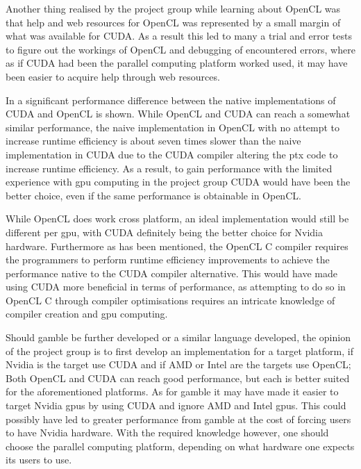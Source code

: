 Another thing realised by the project group while learning about OpenCL was that help and web resources for OpenCL was represented by a small margin of what was available for CUDA.
As a result this led to many a trial and error tests to figure out the workings of OpenCL and debugging of encountered errors, where as if CUDA had been the parallel computing platform worked used, it may have been easier to acquire help through web resources.

In  a significant performance difference between the native implementations of CUDA and OpenCL is shown.
While OpenCL and CUDA can reach a somewhat similar performance, the naive implementation in OpenCL with no attempt to increase runtime efficiency is about seven times slower than the naive implementation in CUDA due to the CUDA compiler altering the \acrshort{ptx} code to increase runtime efficiency.
As a result, to gain performance with the limited experience with \acrshort{gpu} computing in the project group CUDA would have been the better choice, even if the same performance is obtainable in OpenCL.

While OpenCL does work cross platform, an ideal implementation would still be different per \acrshort{gpu}, with CUDA definitely being the better choice for Nvidia hardware.
Furthermore as has been mentioned, the OpenCL C compiler requires the programmers to perform runtime efficiency improvements to achieve the performance native to the CUDA compiler alternative.
This would have made using CUDA more beneficial in terms of performance, as attempting to do so in OpenCL C through compiler optimisations requires an intricate knowledge of compiler creation and \acrshort{gpu} computing.

Should \gls{gamble} be further developed or a similar language developed, the opinion of the project group is to first develop an implementation for a target platform, if Nvidia is the target use CUDA and if AMD or Intel are the targets use OpenCL; Both OpenCL and CUDA can reach good performance, but each is better suited for the aforementioned platforms.
As for \gls{gamble} it may have made it easier to target Nvidia \acrshort{gpu}s by using CUDA and ignore AMD and Intel \acrshort{gpu}s. 
This could possibly have led to greater performance from \acrshort{gamble} at the cost of forcing users to have Nvidia hardware.
With the required knowledge however, one should choose the parallel computing platform, depending on what hardware one expects its users to use.